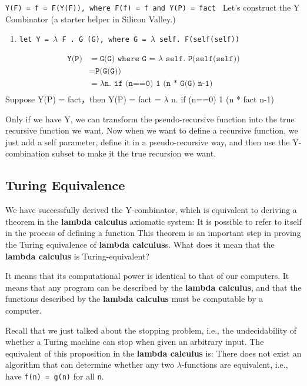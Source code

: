 \documentclass[a4paper]{exam}
\begin{document}
\texttt{Y(F) = f = F(Y(F)), where F(f) = f and Y(P) = fact }
Let's construct the Y Combinator (a starter helper in Silicon Valley.)
\begin{enumerate}
    \item \texttt{let Y = $\lambda$ F . G (G), where G =  $\lambda$ self. F(self(self))}
\end{enumerate}

\begin{equation}
    \begin{split}
        \texttt{Y(P)} &=\texttt{G(G)}\texttt{ where  G = }\lambda\texttt{ self. P(self(self))}\\
&= \texttt{P(G(G))}\\
&= \lambda \texttt{n. if (n==0) 1 (n * G(G) n-1)}\\
\end{split}
\end{equation}
Suppose Y(P) = fact，then Y(P) = fact = $\lambda$ n. if (n==0) 1 (n * fact n-1)

Only if we have Y, we can transform the pseudo-recursive function into the true recursive function we want. Now when we want to define a recursive function, we just add a self parameter, define it in a pseudo-recursive way, and then use the Y-combination subset to make it the true recursion we want.

\subsection{Turing Equivalence}

We have successfully derived the Y-combinator, which is equivalent to deriving a theorem in the \textbf{lambda calculus} axiomatic system:
 It is possible to refer to itself in the process of defining a function This theorem is an important step in proving the Turing equivalence of \textbf{lambda calculus}s. What does it mean that the \textbf{lambda calculus} is Turing-equivalent?

It means that its computational power is identical to that of our computers. It means that any program can be described by the \textbf{lambda calculus}, and that the functions described by the \textbf{lambda calculus} must be computable by a computer.

Recall that we just talked about the stopping problem, i.e., the undecidability of whether a Turing machine can stop when given an arbitrary input.
The equivalent of this proposition in the \textbf{lambda calculus} is: There does not exist an algorithm that can determine whether any two $\lambda$-functions are equivalent, i.e., have \texttt{f(n) = g(n)} for all \texttt{n}.
\end{document}
